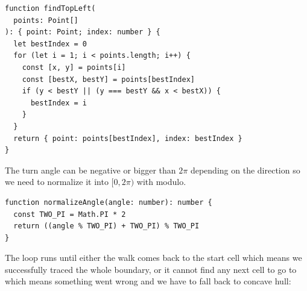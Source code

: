 \documentclass[12pt]{extreport}
\begin{document}
\begin{lstlisting}[style=tsstyle, caption={Finding the start cell (\texttt{geometry.ts})}]
function findTopLeft(
  points: Point[]
): { point: Point; index: number } {
  let bestIndex = 0
  for (let i = 1; i < points.length; i++) {
    const [x, y] = points[i]
    const [bestX, bestY] = points[bestIndex]
    if (y < bestY || (y === bestY && x < bestX)) {
      bestIndex = i
    }
  }
  return { point: points[bestIndex], index: bestIndex }
}
\end{lstlisting}

The turn angle can be negative or bigger than $2\pi$ depending on the direction so we need to normalize it into $[0, 2\pi)$ with modulo.

\begin{lstlisting}[style=tsstyle, caption={Angle normalization (\texttt{geometry.ts})}]
function normalizeAngle(angle: number): number {
  const TWO_PI = Math.PI * 2
  return ((angle % TWO_PI) + TWO_PI) % TWO_PI
}
\end{lstlisting}

The loop runs until either the walk comes back to the start cell which means we successfully traced the whole boundary, or it cannot find any next cell to go to which means something went wrong and we have to fall back to concave hull:
\end{document}
